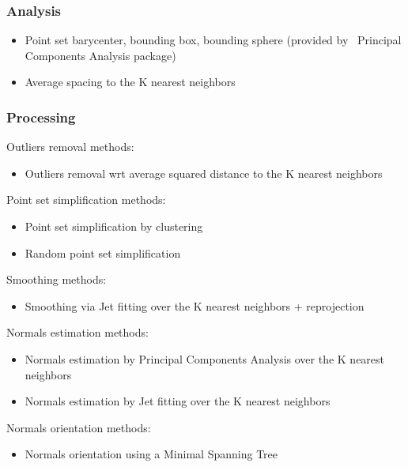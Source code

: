 \subsubsection{Analysis}

\begin{itemize}
\item Point set barycenter, bounding box, bounding sphere (provided by \cgal\ Principal Components Analysis package)
\item Average spacing to the K nearest neighbors
\end{itemize}


\subsubsection{Processing}

Outliers removal methods:

\begin{itemize}
\item Outliers removal wrt average squared distance to the K nearest neighbors
\end{itemize}

Point set simplification methods:

\begin{itemize}
\item Point set simplification by clustering
\item Random point set simplification
\end{itemize}

Smoothing methods:

\begin{itemize}
\item Smoothing via Jet fitting over the K nearest neighbors + reprojection
\end{itemize}

Normals estimation methods:

\begin{itemize}
\item Normals estimation by Principal Components Analysis over the K nearest neighbors
\item Normals estimation by Jet fitting over the K nearest neighbors
\end{itemize}

Normals orientation methods:

\begin{itemize}
\item Normals orientation using a Minimal Spanning Tree \cite{cgal:hddms-srup-92}
\end{itemize}


